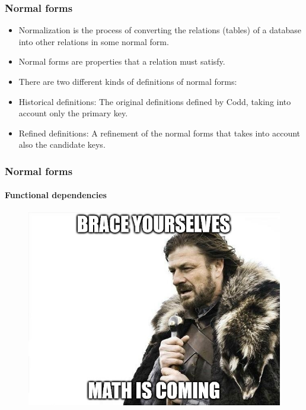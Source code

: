 \documentclass{beamer}
\begin{document}
\begin{frame}
	\frametitle{Normal forms}
	\begin{itemize}
		\item Normalization is the process of converting the relations (tables) of a database into other relations in some normal form.
		\item Normal forms are properties that a relation must satisfy.
		\item There are two different kinds of definitions of normal forms:
		\item Historical definitions: The original definitions defined by Codd, taking into account only the primary key.
		\item Refined definitions: A refinement of the normal forms that takes into account also the candidate keys.		
	\end{itemize}
\end{frame}

\begin{frame}
	\frametitle{Normal forms}
	\framesubtitle{Functional dependencies}
	
	\begin{figure}
		\includegraphics[scale=0.75]{img/normalization/mathiscoming}
	\end{figure}
\end{frame}
\end{document}
